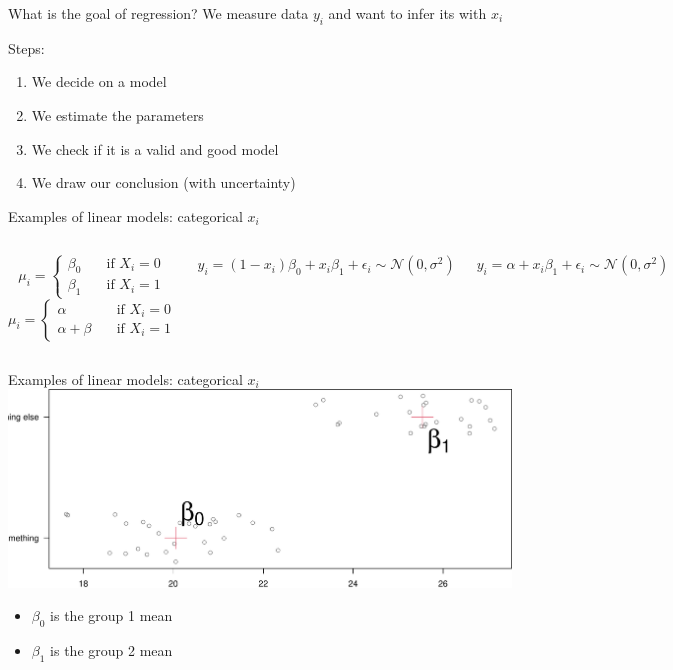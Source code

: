 \documentclass[
  ignorenonframetext,
]{beamer}
\providecommand{\tightlist}{%
  \setlength{\itemsep}{0pt}\setlength{\parskip}{0pt}}
\newcommand{\columnsbegin}{\begin{columns}}
\newcommand{\columnsend}{\end{columns}}
\begin{document}
\begin{frame}{What is the goal of regression?}
\protect\hypertarget{what-is-the-goal-of-regression}{}
We measure data \(y_i\) and want to infer its with \(x_i\)

Steps:

\begin{enumerate}
[1)]
\tightlist
\item
  We decide on a model
\item
  We estimate the parameters
\item
  We check if it is a valid and good model
\item
  We draw our conclusion (with uncertainty)
\end{enumerate}
\end{frame}

\begin{frame}{Examples of linear models: categorical \(x_i\)}
\protect\hypertarget{examples-of-linear-models-categorical-x_i}{}
\columnsbegin
{}

\[
\mu_i =
  \begin{cases}
    \beta_0       & \quad \text{if } X_i =0 \\
    \beta_1      & \quad \text{if } X_i =1  
  \end{cases}
\] \[
\mu_i =
  \begin{cases}
    \alpha       & \quad \text{if } X_i =0 \\
    \alpha + \beta       & \quad \text{if } X_i =1  
  \end{cases}
\] 

\(y_i = (1-x_i)\beta_0 + x_i\beta_1 + \epsilon_i\sim \mathcal{N}(0,\sigma^2)\)

\vspace{2\baselineskip}

\(y_i = \alpha+ x_i\beta_1 + \epsilon_i\sim \mathcal{N}(0,\sigma^2)\)

\columnsend
\end{frame}

\begin{frame}{Examples of linear models: categorical \(x_i\)}
\protect\hypertarget{examples-of-linear-models-categorical-x_i-1}{}
\includegraphics{IntroLM_files/figure-beamer/unnamed-chunk-9-1.pdf}

\begin{itemize}
\tightlist
\item
  \(\beta_0\) is the group 1 mean
\item
  \(\beta_1\) is the group 2 mean
\end{itemize}
\end{frame}
\end{document}
